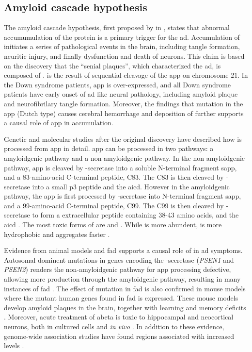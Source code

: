 \subsection{Amyloid cascade hypothesis\label{amy-hypo}}
The amyloid cascade hypothesis, first proposed by \citeauthor{hardy92} in \citeyear{hardy92}, states that abnormal accumumulation of the protein \abeta is a primary trigger for the \gls{ad}. Accumulation of \abeta initiates a series of pathological events in the brain, including tangle formation, neuritic injury, and finally dysfunction and death of neurons. This claim is based on the discovery that the ``senial plaques'', which characterized the \gls{ad}, is composed of \abeta \citep{masters85}. \abeta is the result of sequential cleavage of the \gls{app} on chromosome 21. In the Down syndrome patients, \gls{app} is over-expressed, and all Down syndrome patients have early onset of \gls{ad} like neural pathology, including amyloid plaque and neurofibrilary tangle formation\citep{wisniewski85, hardy02}. Moreover, the findings that mutation in the \gls{app} (Dutch type) causes cerebral hemorrhage and deposition of \abeta further supports a causal role of \gls{app} in \abeta accumulation.

Genetic and molecular studies after the original discovery have described how \abeta is processed from \gls{app} in detail. \gls{app} can be processed in two pathways: a amyloidgenic pathway and a non-amyloidgenic pathway. In the non-amyloidgenic pathway, \gls{app} is cleaved by \textalpha-secretase into a soluble N-terminal fragment s\gls{app}\textalpha, and a 83-amino-acid C-terminal peptide, C83. The C83 is then cleaved by \textgamma-secretase into a small p3 peptide and the \gls{aicd}. However in the amyloidgenic pathway, the \gls{app} is first processed by \textbeta-secretase into N-terminal fragment s\gls{app}\textbeta, and a 99-amino-acid C-terminal peptide, C99. The C99 is then cleaved by \textgamma-secretase to form a extracellular peptide containing 38-43 amino acids, \abeta and the \gls{aicd} \citep{barage15}. The most toxic forms of \abeta are \abeta[40] and \abeta[42]. While \abeta[40] is more abundent, \abeta[42] is more hydrophobic and aggregates faster \citep{walsh07}. 

Evidence from animal models and \gls{fad} supports a causal role of \abeta in \gls{ad} symptoms. Autosomal dominent mutations in genes encoding the \textgamma-secretase (\textit{PSEN1} and \textit{PSEN2}) renders the non-amyloidgenic pathway for \gls{app} processing defective, allowing more \abeta production through the amyloidgenic pathway, resulting in many instances of \gls{fad} \citep{suzuki94, levy-lahad95, rogaev95}. The effect of mutation in \gls{fad} is also confirmed in mouse models where the mutant human genes found in \gls{fad} is expressed. These mouse models develop amyloid plaques in the brain, together with learning and memory deficits \citep{hsiao96, dodart99, chishti01, westerman02}. Moreover, acute treatment of \gls{abeta} is toxic to hippocampal and neocortical neurons, both in cultured cells and \textit{in vivo} \citep{lacor04, shankar08}. In addition to these evidence, genome-wide association studies have found regions associated with increased \abeta levels \citep{kehoe99, myers00}.

